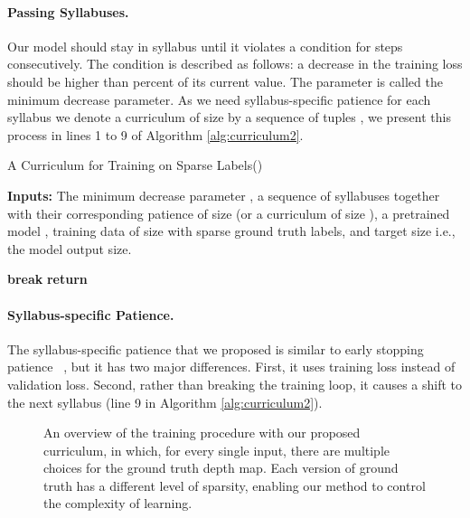 \documentclass{article}
\begin{document}
\paragraph{Passing Syllabuses.} Our model should stay in syllabus  until it violates a condition for  steps consecutively. The condition is described as follows: a decrease in the training loss should be higher than  percent of its current value. The parameter  is called the minimum decrease parameter. As we need syllabus-specific patience  for each syllabus  we denote a curriculum of size  by a sequence of tuples , we present this process in lines 1 to 9 of Algorithm \ref{alg:curriculum2}.



\begin{algorithm}[H]
\caption{A Curriculum for Training on Sparse Labels()}\label{alg:curriculum2}
  \textbf{Inputs:} The minimum decrease parameter , a sequence of syllabuses together with their corresponding patience  of size  (or a curriculum of size ), a pretrained model , training data  of size  with sparse ground truth labels, and target size  i.e., the model output size.
  \begin{algorithmic}[1]
    \For{}
        \State 
        \For{}
            \State  
            \State 
            \State 
            \If{}
                \State 
                \If{}
                    \State \textbf{break}
                \EndIf
            \EndIf
        \EndFor
    \EndFor
    \State \textbf{return} 
    \EndProcedure
  \end{algorithmic}
\end{algorithm}

\paragraph{Syllabus-specific Patience.} The syllabus-specific patience that we proposed is  similar to early stopping patience ~\cite{prechelt1998early}, but it has two major differences. First, it uses training loss instead of validation loss. Second, rather than breaking the training loop, it causes a shift to the next syllabus (line 9 in Algorithm \ref{alg:curriculum2}).
\begin{figure}[H]
    \caption{An overview of the training procedure with our proposed curriculum, in which, for every single input, there are multiple choices for the ground truth depth map. Each version of ground truth has a different level of sparsity, enabling our method to control the complexity of learning.}
    \label{fig:diagram}
\end{figure}
\end{document}
